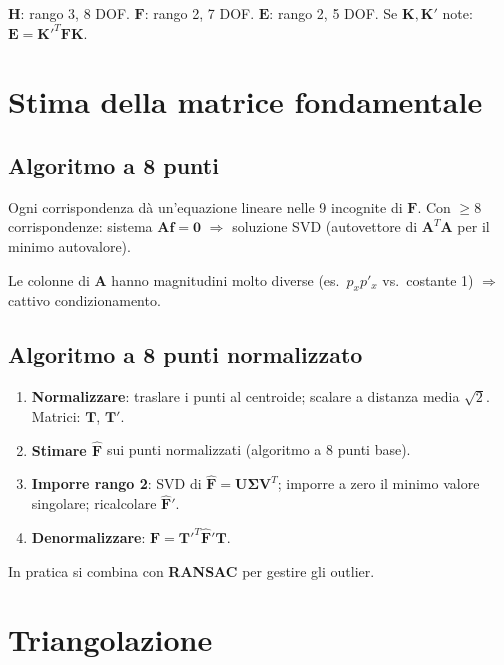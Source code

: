 \documentclass[12pt, a4paper]{report}
\begin{document}
\begin{notebox}[F vs.\ E vs.\ H]
$\mathbf{H}$: rango 3, 8 DOF. $\mathbf{F}$: rango 2, 7 DOF.
$\mathbf{E}$: rango 2, 5 DOF. Se $\mathbf{K},\mathbf{K}'$ note:
$\mathbf{E}=\mathbf{K}'^T\mathbf{F}\mathbf{K}$.
\end{notebox}

\section{Stima della matrice fondamentale}

\subsection{Algoritmo a 8 punti}

Ogni corrispondenza dà un'equazione lineare nelle 9 incognite di $\mathbf{F}$.
Con $\geq8$ corrispondenze: sistema $\mathbf{Af}=\mathbf{0}$
$\Rightarrow$ soluzione SVD (autovettore di $\mathbf{A}^T\mathbf{A}$
per il minimo autovalore).

\begin{warnbox}
Le colonne di $\mathbf{A}$ hanno magnitudini molto diverse
(es.\ $p_xp'_x$ vs.\ costante 1) $\Rightarrow$ cattivo condizionamento.
\end{warnbox}

\subsection{Algoritmo a 8 punti normalizzato}

\begin{enumerate}
  \item \textbf{Normalizzare}: traslare i punti al centroide; scalare a distanza
        media $\sqrt{2}$. Matrici: $\mathbf{T}$, $\mathbf{T}'$.
  \item \textbf{Stimare $\hat{\mathbf{F}}$} sui punti normalizzati (algoritmo
        a 8 punti base).
  \item \textbf{Imporre rango 2}: SVD di $\hat{\mathbf{F}}=\mathbf{U}\boldsymbol{\Sigma}\mathbf{V}^T$;
        imporre a zero il minimo valore singolare; ricalcolare $\hat{\mathbf{F}}'$.
  \item \textbf{Denormalizzare}: $\mathbf{F}=\mathbf{T}'^T\hat{\mathbf{F}}'\mathbf{T}$.
\end{enumerate}

In pratica si combina con \textbf{RANSAC} per gestire gli outlier.

\section{Triangolazione}
\end{document}
